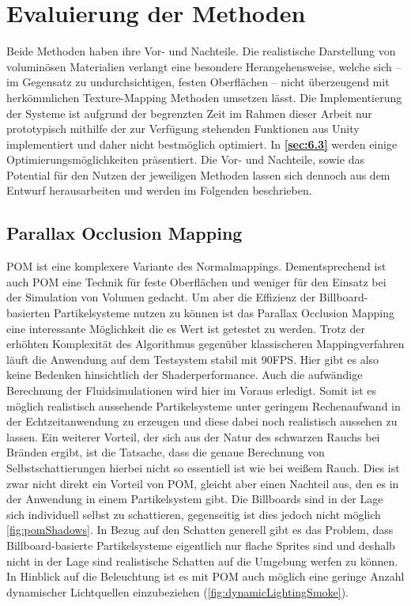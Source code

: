 \section{Evaluierung der Methoden}
\label{sec:5}

Beide Methoden haben ihre Vor- und Nachteile. Die realistische Darstellung von voluminösen Materialien verlangt
eine besondere Herangehensweise, welche sich – im Gegensatz zu undurchsichtigen, festen Oberflächen –
nicht überzeugend mit herkömmlichen Texture-Mapping Methoden umsetzen lässt.
Die Implementierung der Systeme ist aufgrund der begrenzten Zeit im Rahmen dieser Arbeit nur prototypisch mithilfe der
zur Verfügung stehenden Funktionen aus Unity implementiert und daher nicht bestmöglich optimiert.
In \textbf{\autoref{sec:6.3}} werden einige Optimierungsmöglichkeiten präsentiert.
Die Vor- und Nachteile, sowie das Potential für den Nutzen der jeweiligen Methoden lassen sich dennoch aus dem Entwurf
herausarbeiten und werden im Folgenden beschrieben.


\subsection{Parallax Occlusion Mapping}
\label{sec:5.1}


POM ist eine komplexere Variante des Normalmappings. Dementsprechend ist auch POM eine Technik für feste Oberflächen und weniger
für den Einsatz bei der Simulation von Volumen gedacht. Um aber die Effizienz der Billboard-basierten Partikelsysteme
nutzen zu können ist das Parallax Occlusion Mapping eine interessante Möglichkeit die es Wert ist getestet zu werden.
Trotz der erhöhten Komplexität des Algorithmus gegenüber klassischeren Mappingverfahren läuft die Anwendung auf dem Testsystem
stabil mit 90FPS. Hier gibt es also keine Bedenken hinsichtlich der Shaderperformance. Auch die aufwändige Berechnung der
Fluidsimulationen wird hier im Voraus erledigt. Somit ist es möglich realistisch aussehende Partikelsysteme unter geringem
Rechenaufwand in der Echtzeitanwendung zu erzeugen und diese dabei noch realistisch aussehen zu lassen.
Ein weiterer Vorteil, der sich aus der Natur des schwarzen Rauchs bei Bränden ergibt, ist die Tatsache, dass die genaue Berechnung
von Selbstschattierungen hierbei nicht so essentiell ist wie bei weißem Rauch.
Dies ist zwar nicht direkt ein Vorteil von POM, gleicht aber einen Nachteil aus, den es in der Anwendung in einem Partikelsystem gibt.
Die Billboards sind in der Lage sich individuell selbst zu schattieren, gegenseitig ist dies jedoch nicht möglich \autoref{fig:pomShadows}. In Bezug auf den Schatten generell
gibt es das Problem, dass Billboard-basierte Partikelsysteme eigentlich nur flache Sprites sind und deshalb nicht in der Lage sind realistische Schatten
auf die Umgebung werfen zu können. In Hinblick auf die Beleuchtung ist es mit POM auch möglich eine geringe Anzahl dynamischer Lichtquellen einzubeziehen 
(\autoref{fig:dynamicLightingSmoke}).

